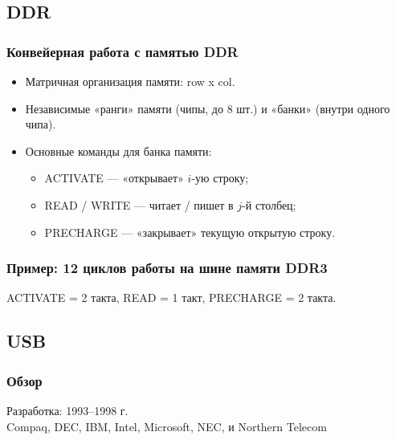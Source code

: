 \subsection{DDR}
\begin{frame}
\frametitle{Конвейерная работа с памятью DDR}
\begin{itemize}
    \item Матричная организация памяти: row x col.
    \pause\item Независимые «ранги» памяти (чипы, до 8 шт.) и «банки» (внутри одного чипа).
    \pause\item Основные команды для банка памяти:
    \begin{itemize}
        \item ACTIVATE — «открывает» $i$-ую строку;
        \item READ / WRITE — читает / пишет в $j$-й столбец;
        \item PRECHARGE — «закрывает» текущую открытую строку.
    \end{itemize}
\end{itemize}
\end{frame}

\begin{frame}
\frametitle{Пример: 12 циклов работы на шине памяти DDR3}
ACTIVATE = 2 такта, \hfill READ = 1 такт, \hfill PRECHARGE = 2 такта.
\end{frame}

\subsection{USB}
\begin{frame}
\frametitle{Обзор}
Разработка: 1993–1998 г.\\
Compaq, DEC, IBM, Intel, Microsoft, NEC, и Northern Telecom
\begin{columns}
    \column{5cm}

    \column{5cm}
\end{columns}
\end{frame}


